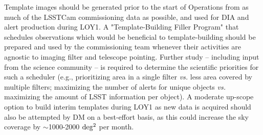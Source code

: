 \documentclass[DM,toc]{lsstdoc}
\begin{document}
Template images should be generated prior to the start of Operations from as much of the LSSTCam commissioning data as possible, and used for DIA and alert production during LOY1.
A "Template-Building Filler Program" that schedules observations which would be beneficial to template-building should be prepared and used by the commissioning team whenever their activities are agnostic to imaging filter and telescope pointing.
Further study -- including input from the science community -- is required to determine the scientific priorities for such a scheduler (e.g., prioritizing area in a single filter {\it vs.} less area covered by multiple filters; maximizing the number of alerts for unique objects {\it vs.} maximizing the amount of LSST information per object).
A moderate up-scope option to build interim templates during LOY1 as new data is acquired should also be attempted by DM on a best-effort basis, as this could increase the sky coverage by $\sim$1000-2000 $\rm deg^2$ per month.

\clearpage

\end{document}
